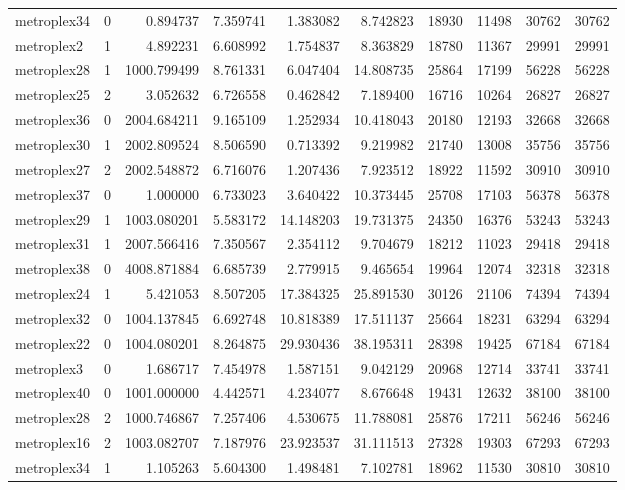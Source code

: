 \begin{longtable}{|l|r|r|r|r|r|r|r|r|r|}
metroplex34 & 0 & 0.894737 & 7.359741 & 1.383082 & 8.742823 & 18930 & 11498 & 30762 & 30762 \\
metroplex2 & 1 & 4.892231 & 6.608992 & 1.754837 & 8.363829 & 18780 & 11367 & 29991 & 29991 \\
metroplex28 & 1 & 1000.799499 & 8.761331 & 6.047404 & 14.808735 & 25864 & 17199 & 56228 & 56228 \\
metroplex25 & 2 & 3.052632 & 6.726558 & 0.462842 & 7.189400 & 16716 & 10264 & 26827 & 26827 \\
metroplex36 & 0 & 2004.684211 & 9.165109 & 1.252934 & 10.418043 & 20180 & 12193 & 32668 & 32668 \\
metroplex30 & 1 & 2002.809524 & 8.506590 & 0.713392 & 9.219982 & 21740 & 13008 & 35756 & 35756 \\
metroplex27 & 2 & 2002.548872 & 6.716076 & 1.207436 & 7.923512 & 18922 & 11592 & 30910 & 30910 \\
metroplex37 & 0 & 1.000000 & 6.733023 & 3.640422 & 10.373445 & 25708 & 17103 & 56378 & 56378 \\
metroplex29 & 1 & 1003.080201 & 5.583172 & 14.148203 & 19.731375 & 24350 & 16376 & 53243 & 53243 \\
metroplex31 & 1 & 2007.566416 & 7.350567 & 2.354112 & 9.704679 & 18212 & 11023 & 29418 & 29418 \\
metroplex38 & 0 & 4008.871884 & 6.685739 & 2.779915 & 9.465654 & 19964 & 12074 & 32318 & 32318 \\
metroplex24 & 1 & 5.421053 & 8.507205 & 17.384325 & 25.891530 & 30126 & 21106 & 74394 & 74394 \\
metroplex32 & 0 & 1004.137845 & 6.692748 & 10.818389 & 17.511137 & 25664 & 18231 & 63294 & 63294 \\
metroplex22 & 0 & 1004.080201 & 8.264875 & 29.930436 & 38.195311 & 28398 & 19425 & 67184 & 67184 \\
metroplex3 & 0 & 1.686717 & 7.454978 & 1.587151 & 9.042129 & 20968 & 12714 & 33741 & 33741 \\
metroplex40 & 0 & 1001.000000 & 4.442571 & 4.234077 & 8.676648 & 19431 & 12632 & 38100 & 38100 \\
metroplex28 & 2 & 1000.746867 & 7.257406 & 4.530675 & 11.788081 & 25876 & 17211 & 56246 & 56246 \\
metroplex16 & 2 & 1003.082707 & 7.187976 & 23.923537 & 31.111513 & 27328 & 19303 & 67293 & 67293 \\
metroplex34 & 1 & 1.105263 & 5.604300 & 1.498481 & 7.102781 & 18962 & 11530 & 30810 & 30810 \\

\end{longtable}
